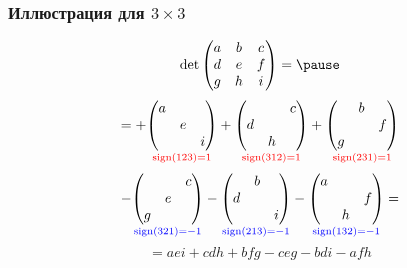 \begin{frame}
    \frametitle{Иллюстрация для $3\times 3$}

    \[
    \det \begin{pmatrix}
        a & b & c \\
        d & e & f \\
        g & h & i \\
    \end{pmatrix} = \pause
    \]
\[
= +\underset{\textcolor{red}{\operatorname{sign}(123)=1}}{\begin{pmatrix}
    a &  &  \\
     & e &  \\
     &  & i \\
\end{pmatrix}} +
\underset{\textcolor{red}{\operatorname{sign}(312)=1}}{\begin{pmatrix}
     &  & c \\
    d &  &  \\
     & h &  \\
\end{pmatrix}} +
\underset{\textcolor{red}{\operatorname{sign}(231)=1}}{\begin{pmatrix}
     & b &  \\
     &  & f \\
    g &  &  \\
\end{pmatrix}}
\]
\[
- \underset{\textcolor{blue}{\operatorname{sign}(321)=-1}}{\begin{pmatrix}
     &  & c \\
     & e &  \\
    g &  &  \\
\end{pmatrix}} 
- \underset{\textcolor{blue}{\operatorname{sign}(213)=-1}}{\begin{pmatrix}
     & b & \\
    d &  &  \\
     &  & i \\
\end{pmatrix}} 
- \underset{\textcolor{blue}{\operatorname{sign}(132)=-1}}{\begin{pmatrix}
    a &  &  \\
     &  & f \\
     & h &  \\
\end{pmatrix}}=
\]
\pause
\[
= aei + cdh + bfg - ceg - bdi - afh
\]




\end{frame}



